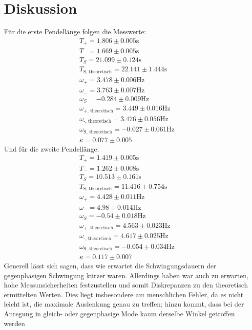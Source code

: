 \section{Diskussion}
Für die erste Pendellänge folgen die Messwerte:
\begin{align*}
T_{+} = 1.806\pm 0.005\si{\s}\\
T_{-} = 1.669\pm 0.005\si{\s}\\
T_{S} = 21.099 \pm 0.124\si{\s}\\
T_\text{S, theoretisch}= 22.141 \pm 1.444\si{\s}\\
\omega_{+} = 3.478\pm 0.006\si{\Hz}\\
\omega_{-} = 3.763\pm 0.007\si{\Hz}\\
\omega_{S}=-0.284\pm 0.009\si{\Hz}\\
\omega_\text{+, theoretisch} = 3.449\pm 0.016 \si{\Hz}\\
\omega_\text{-, theoretisch} = 3.476\pm 0.056 \si{\Hz}\\
\omega_\text{S, theoretisch} = -0.027 \pm 0.061\si{\Hz}\\
\kappa = 0.077 \pm 0.005
\end{align*}
Und für die zweite Pendellänge:
\begin{align*}
T_{+} = 1.419\pm 0.005\si{\s}\\
T_{-} = 1.262\pm 0.008\si{\s}\\
T_{S} = 10.513\pm 0.161\si{\s}\\
T_\text{S, theoretisch} = 11.416\pm 0.754\si{\s}\\
\omega_{+} = 4.428\pm 0.011\si{\Hz} \\
\omega_{-} = 4.98\pm 0.014\si{\Hz}\\
\omega_{S} = -0.54 \pm 0.018\si{\Hz}\\
\omega_\text{+, theoretisch} = 4.563 \pm 0.023\si{\Hz}\\
\omega_\text{-, theoretisch} = 4.617 \pm 0.025\si{\Hz}\\
\omega_\text{S, theoretisch} = -0.054 \pm 0.034\si{\Hz}\\
\kappa = 0.117 \pm 0.007
\end{align*}
Generell lässt sich sagen, dass wie erwartet die Schwingungsdauern der gegenphasigen Schwingung kürzer waren. Allerdings haben war auch zu erwarten, hohe 
Messunsicherheiten festzustellen und somit Diskrepanzen zu den theoretisch ermittelten Werten. Dies liegt insbesondere am menschlichen Fehler, da es nicht
leicht ist, die maximale Auslenkung genau zu treffen; hinzu kommt, dass bei der Anregung in gleich- oder gegenphasige Mode kaum derselbe Winkel getroffen werden
